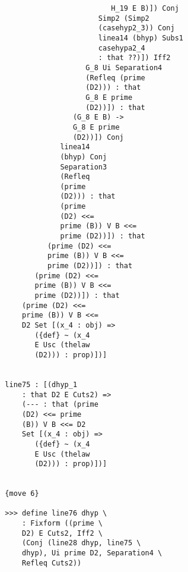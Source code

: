 \documentclass[12pt]{article}
\begin{document}
\begin{verbatim}
                                              H_19 E B)]) Conj 
                                           Simp2 (Simp2 
                                           (casehyp2_3)) Conj 
                                           linea14 (bhyp) Subs1 
                                           casehypa2_4 
                                           : that ??)]) Iff2 
                                        G_8 Ui Separation4 
                                        (Refleq (prime 
                                        (D2))) : that 
                                        G_8 E prime 
                                        (D2))]) : that 
                                     (G_8 E B) -> 
                                     G_8 E prime 
                                     (D2))]) Conj 
                                  linea14 
                                  (bhyp) Conj 
                                  Separation3 
                                  (Refleq 
                                  (prime 
                                  (D2))) : that 
                                  (prime 
                                  (D2) <<= 
                                  prime (B)) V B <<= 
                                  prime (D2))]) : that 
                               (prime (D2) <<= 
                               prime (B)) V B <<= 
                               prime (D2))]) : that 
                            (prime (D2) <<= 
                            prime (B)) V B <<= 
                            prime (D2))]) : that 
                         (prime (D2) <<= 
                         prime (B)) V B <<= 
                         D2 Set [(x_4 : obj) => 
                            ({def} ~ (x_4 
                            E Usc (thelaw 
                            (D2))) : prop)])]


                     line75 : [(dhyp_1 
                         : that D2 E Cuts2) => 
                         (--- : that (prime 
                         (D2) <<= prime 
                         (B)) V B <<= D2 
                         Set [(x_4 : obj) => 
                            ({def} ~ (x_4 
                            E Usc (thelaw 
                            (D2))) : prop)])]


                     {move 6}

                     >>> define line76 dhyp \
                         : Fixform ((prime \
                         D2) E Cuts2, Iff2 \
                         (Conj (line28 dhyp, line75 \
                         dhyp), Ui prime D2, Separation4 \
                         Refleq Cuts2))



\end{verbatim}
\end{document}
